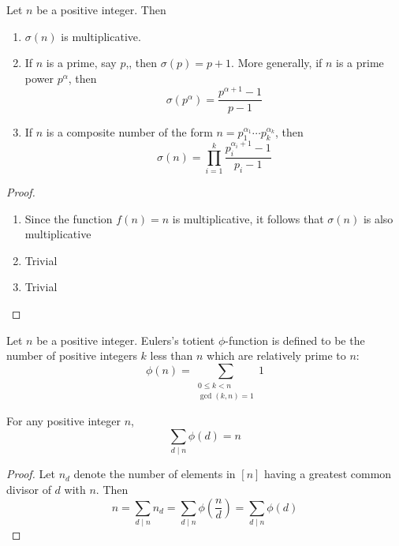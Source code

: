\begin{theorem}
    Let $n$ be a positive integer. Then 
    \begin{enumerate}
        \item $\sigma(n)$ is multiplicative.
        \item If $n$ is a prime, say $p$,, then $\sigma(p) = p + 1$. More generally, if $n$ is a prime power $p^\alpha$, then
        \begin{equation*}
            \sigma(p^\alpha) = \frac{p^{\alpha + 1} - 1}{p - 1}
        \end{equation*}
        \item If $n$ is a composite number of the form $n = p_1^{\alpha_1}\cdots p_k^{\alpha_k}$, then
        \begin{equation*}
            \sigma(n) = \prod_{i=1}^k\frac{p_i^{\alpha_i + 1} - 1}{p_i - 1}
        \end{equation*}
    \end{enumerate}
\end{theorem}
\begin{proof}
    \hfill 
    \begin{enumerate}
        \item Since the function $f(n) = n$ is multiplicative, it follows that $\sigma(n)$ is also multiplicative 
        \item Trivial 
        \item Trivial 
    \end{enumerate}
\end{proof}

\begin{definition}
    Let $n$ be a positive integer. Eulers's totient $\phi$-function is defined to be the number of positive integers $k$ less than $n$ which are relatively prime to $n$:
    \begin{equation*}
        \phi(n) = \sum_{\substack{0\le k < n\\\gcd(k,n) = 1}}1
    \end{equation*}
\end{definition}

\begin{lemma}
    For any positive integer $n$,
    \begin{equation*}
        \sum_{d\mid n}\phi(d) = n
    \end{equation*}
\end{lemma}
\begin{proof}
    Let $n_d$ denote the number of elements in $[n]$ having a greatest common divisor of $d$ with $n$. Then 
    \begin{equation*}
        n = \sum_{d\mid n}n_d = \sum_{d\mid n}\phi\left(\frac{n}{d}\right) = \sum_{d\mid n}\phi(d)
    \end{equation*}
\end{proof}

